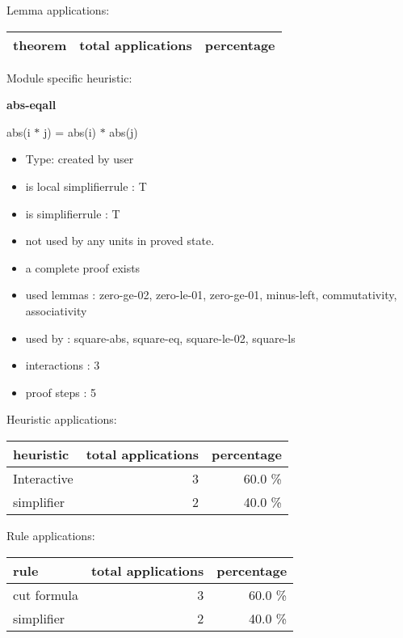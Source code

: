 \documentclass[a4paper]{article}
\begin{document}
Lemma applications:

\begin{supertabular}{l|r|r}
theorem	        & total applications & percentage \\ \hline

\end{supertabular}

Module specific heuristic:

\pagebreak

{\LARGE\bf abs-eqall}\label{lemma-abs-eqall}

\medskip

 \Fol abs(i $*$ j) = abs(i) $*$ abs(j)

\begin{itemize}

\item Type: created by user

\item is local simplifierrule : T
\item is simplifierrule : T
\item not used by any units in proved state.
\item       a complete proof exists
\item       used lemmas  : zero-ge-02, zero-le-01, zero-ge-01, minus-left, commutativity, associativity
\item       used by      : square-abs, square-eq, square-le-02, square-ls
\item       interactions : 3
\item       proof steps  : 5
\end{itemize}

\medskip


Heuristic applications:

\begin{supertabular}{l|r|r}
heuristic	& total applications & percentage \\ \hline
Interactive & 3 & 60.0 \% \\
simplifier & 2 & 40.0 \% \\

\end{supertabular}

Rule applications:

\begin{supertabular}{l|r|r}
rule	        & total applications & percentage \\ \hline
cut formula & 3 & 60.0 \% \\
simplifier & 2 & 40.0 \% \\

\end{supertabular}
\end{document}
